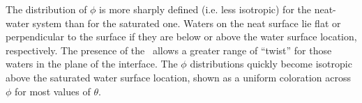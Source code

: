 The distribution of $\phi$ is more sharply defined (i.e. less isotropic) for the neat-water system than for the saturated one. Waters on the neat surface lie flat or perpendicular to the surface if they are below or above the water surface location, respectively. The presence of the \suldiox~allows a greater range of ``twist'' for those waters in the plane of the interface. The $\phi$ distributions quickly become isotropic above the saturated water surface location, shown as a uniform coloration across $\phi$ for most values of $\theta$.



